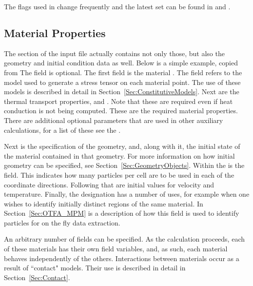 The \MPM flags used in \Vaango change frequently and the latest set can be
found in \newline{} and .

\subsection{Material Properties} \label{Sec:mat_props}

The  section of the input file
actually contains not only those, but also the geometry and initial
condition data as well.  Below is a simple example, copied from
  The  field
is optional.  The first field is the material .
The  field refers
to the model used to generate a stress tensor on each material point.
The use of these models is described in detail in
Section~\ref{Sec:ConstitutiveModels}.  Next are the thermal transport properties,
 and 
.  Note that these are required even if
heat conduction is not being computed.  These are the required material
properties.  There are additional optional parameters that are used in
other auxiliary calculations, for a list of these
see the .

Next is the specification of the geometry, and, along with it, the initial
state of the material contained in that geometry.  For more information on
how initial geometry can be specified, see Section~\ref{Sec:GeometryObjects}.  Within the
 is the  field.  This
indicates how many particles per cell are to be used in each of the 
coordinate directions.  Following that are initial values for velocity and
temperature.  Finally, the  designation has a number
of uses, for example when one wishes to identify initially distinct regions
of the same material.  In Section~\ref{Sec:OTFA_MPM} is a description of how
this field is used to identify particles for on the fly data extraction.

An arbitrary number of  fields can be specified.
As the calculation proceeds, each of these materials has their own field
variables, and, as such, each material behaves independently of the others.
Interactions between materials occur as a result of ``contact" models.
Their use is described in detail in Section~\ref{Sec:Contact}.

